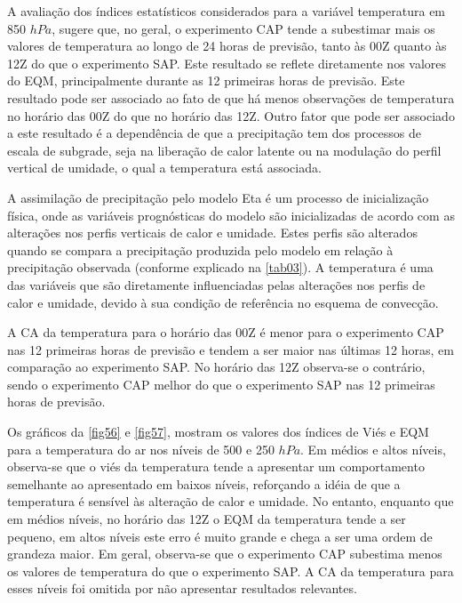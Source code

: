 A avaliação dos índices estatísticos considerados para a variável temperatura em 850 $hPa$, sugere que, no geral, o experimento CAP tende a subestimar mais os valores de temperatura ao longo de 24 horas de previsão, tanto às 00Z quanto às 12Z do que o experimento SAP. Este resultado se reflete diretamente nos valores do EQM, principalmente durante as 12 primeiras horas de previsão. Este resultado pode ser associado ao fato de que há menos observações de temperatura no horário das 00Z do que no horário das 12Z. Outro fator que pode ser associado a este resultado é a dependência de que a precipitação tem dos processos de escala de subgrade, seja na liberação de calor latente ou na modulação do perfil vertical de umidade, o qual a temperatura está associada.

A assimilação de precipitação pelo modelo Eta é um processo de inicialização física, onde as variáveis prognósticas do modelo são inicializadas de acordo com as alterações nos perfis verticais de calor e umidade. Estes perfis são alterados quando se compara a precipitação produzida pelo modelo em relação à precipitação observada (conforme explicado na \autoref{tab03}). A temperatura é uma das variáveis que são diretamente influenciadas pelas alterações nos perfis de calor e umidade, devido à sua condição de referência no esquema de convecção. 

A CA da temperatura para o horário das 00Z é menor para o experimento CAP nas 12 primeiras horas de previsão e tendem a ser maior nas últimas 12 horas, em comparação ao experimento SAP. No horário das 12Z observa-se o contrário, sendo o experimento CAP melhor do que o experimento SAP nas 12 primeiras horas de previsão.

Os gráficos da \autoref{fig56} e \autoref{fig57}, mostram os valores dos índices de Viés e EQM para a temperatura do ar nos níveis de 500 e 250 $hPa$. Em médios e altos níveis, observa-se que o viés da temperatura tende a apresentar um comportamento semelhante ao apresentado em baixos níveis, reforçando a idéia de que a temperatura é sensível às alteração de calor e umidade. No entanto, enquanto que em médios níveis, no horário das 12Z o EQM da temperatura tende a ser pequeno, em altos níveis este erro é muito grande e chega a ser uma ordem de grandeza maior. Em geral, observa-se que o experimento CAP subestima menos os valores de temperatura do que o experimento SAP. A CA da temperatura para esses níveis foi omitida por não apresentar resultados relevantes.
     
